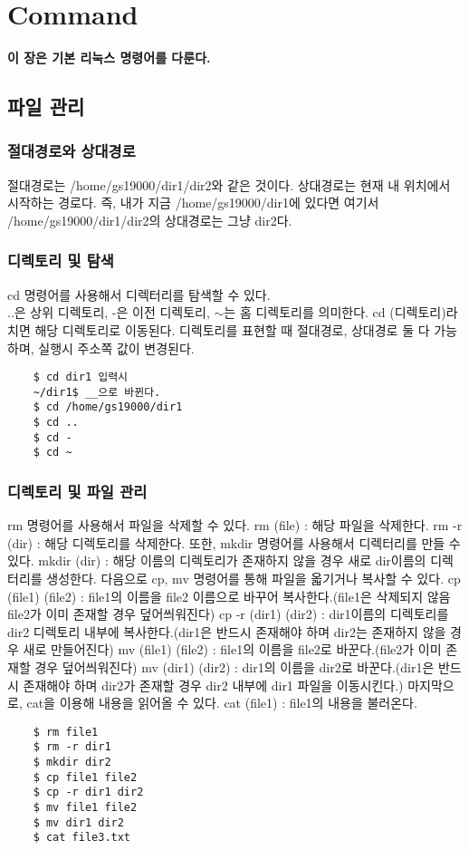 
\graphicspath{{./chap3/images/}} 
\chapter{Command}
\textbf{이 장은 기본 리눅스 명령어를 다룬다.}
\section{파일 관리}
\subsection{절대경로와 상대경로}
절대경로는 /home/gs19000/dir1/dir2와 같은 것이다. 상대경로는 현재 내 위치에서 시작하는 경로다. 즉, 내가 지금 /home/gs19000/dir1에 있다면 여기서 /home/gs19000/dir1/dir2의 상대경로는 그냥 dir2다.
\subsection{디렉토리 및 탐색}
cd 명령어를 사용해서 디렉터리를 탐색할 수 있다. \\ ..은 상위 디렉토리, -은 이전 디렉토리, $\sim$는 홈 디렉토리를 의미한다.
cd (디렉토리)라 치면 해당 디렉토리로 이동된다. 디렉토리를 표현할 때 절대경로, 상대경로 둘 다 가능하며, 실행시 주소쪽 값이 변경된다.
    \begin{lstlisting}
    $ cd dir1 입력시
    ~/dir1$ __으로 바뀐다.
    $ cd /home/gs19000/dir1 
    $ cd ..
    $ cd -
    $ cd ~
    \end{lstlisting}
\subsection{디렉토리 및 파일 관리}
rm 명령어를 사용해서 파일을 삭제할 수 있다. rm (file) : 해당 파일을 삭제한다. rm -r (dir) : 해당 디렉토리를 삭제한다.
또한, mkdir 명령어를 사용해서 디렉터리를 만들 수 있다. mkdir (dir) : 해당 이름의 디렉토리가 존재하지 않을 경우 새로 dir이름의 디렉터리를 생성한다. 다음으로 cp, mv 명령어를 통해 파일을 옯기거나 복사할 수 있다. cp (file1) (file2) : file1의 이름을 file2 이름으로 바꾸어 복사한다.(file1은 삭제되지 않음 file2가 이미 존재할 경우 덮어씌워진다) cp -r (dir1) (dir2) : dir1이름의 디렉토리를 dir2 디렉토리 내부에 복사한다.(dir1은 반드시 존재해야 하며 dir2는 존재하지 않을 경우 새로 만들어진다) mv (file1) (file2) : file1의 이름을 file2로 바꾼다.(file2가 이미 존재할 경우 덮어씌워진다) mv (dir1) (dir2) : dir1의 이름을 dir2로 바꾼다.(dir1은 반드시 존재해야 하며 dir2가 존재할 경우 dir2 내부에 dir1 파일을 이동시킨다.) 마지막으로, cat을 이용해 내용을 읽어올 수 있다. cat (file1) : file1의 내용을 불러온다.
    \begin{lstlisting}
    $ rm file1
    $ rm -r dir1
    $ mkdir dir2
    $ cp file1 file2
    $ cp -r dir1 dir2
    $ mv file1 file2
    $ mv dir1 dir2
    $ cat file3.txt
    \end{lstlisting}
